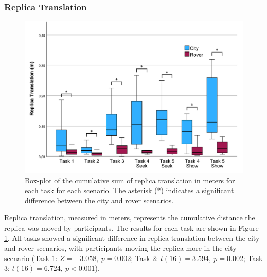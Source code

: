         \subsubsection{Replica Translation}

            
            \begin{figure}[h!]
                \centering
                \includegraphics[width=1\linewidth]{figures/replica_translation_graph.pdf}
                \caption{Box-plot of the cumulative sum of replica translation in meters for each task for each scenario. The asterisk ($\ast$) indicates a significant difference between the city and rover scenarios.}
                \label{fig:task_time}
            \end{figure}

            Replica translation, measured in meters, represents the cumulative distance the replica was moved by participants. The results for each task are shown in Figure \ref{fig:task_time}. All tasks showed a significant difference in replica translation between the city and rover scenarios, with participants moving the replica more in the city scenario (Task 1: $Z = -3.058,\ p = 0.002$; Task 2: $t(16) = 3.594,\ p = 0.002$; Task 3: $t(16) = 6.724,\ p < 0.001$).

